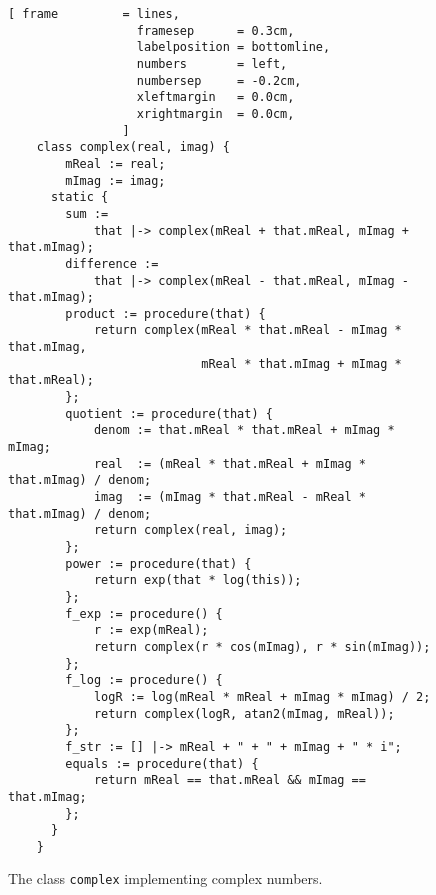 \begin{figure}[!ht]
\centering
\begin{Verbatim}[ frame         = lines, 
                  framesep      = 0.3cm, 
                  labelposition = bottomline,
                  numbers       = left,
                  numbersep     = -0.2cm,
                  xleftmargin   = 0.0cm,
                  xrightmargin  = 0.0cm,
                ]
    class complex(real, imag) {
        mReal := real;
        mImag := imag;
      static {    
        sum := 
            that |-> complex(mReal + that.mReal, mImag + that.mImag);
        difference := 
            that |-> complex(mReal - that.mReal, mImag - that.mImag);
        product := procedure(that) {
            return complex(mReal * that.mReal - mImag * that.mImag,
                           mReal * that.mImag + mImag * that.mReal);
        };
        quotient := procedure(that) {
            denom := that.mReal * that.mReal + mImag * mImag;
            real  := (mReal * that.mReal + mImag * that.mImag) / denom;
            imag  := (mImag * that.mReal - mReal * that.mImag) / denom;
            return complex(real, imag);
        };
        power := procedure(that) {
            return exp(that * log(this));
        };
        f_exp := procedure() {
            r := exp(mReal);
            return complex(r * cos(mImag), r * sin(mImag));
        };
        f_log := procedure() {
            logR := log(mReal * mReal + mImag * mImag) / 2; 
            return complex(logR, atan2(mImag, mReal));
        };
        f_str := [] |-> mReal + " + " + mImag + " * i";
        equals := procedure(that) {
            return mReal == that.mReal && mImag == that.mImag;
        };
      }
    }
\end{Verbatim}
\vspace*{-0.3cm}
\caption{The class \texttt{complex} implementing complex numbers.}
\label{fig:complex.stlx}
\end{figure}

